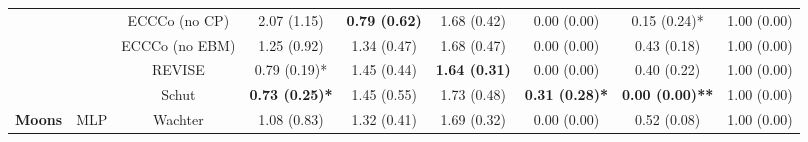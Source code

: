 \begin{table}
{\begin{tabular}[t]{>{}c|c|c|c|c|c|c|c|c}
 &  & ECCCo (no CP) & 2.07 (1.15) & \textbf{0.79 (0.62)} & 1.68 (0.42) & 0.00 (0.00) & 0.15 (0.24)* & 1.00 (0.00)\\

 &  & ECCCo (no EBM) & 1.25 (0.92) & 1.34 (0.47) & 1.68 (0.47) & 0.00 (0.00) & 0.43 (0.18) & 1.00 (0.00)\\

 &  & REVISE & 0.79 (0.19)* & 1.45 (0.44) & \textbf{1.64 (0.31)} & 0.00 (0.00) & 0.40 (0.22) & 1.00 (0.00)\\

 &  & Schut & \textbf{0.73 (0.25)*} & 1.45 (0.55) & 1.73 (0.48) & \textbf{0.31 (0.28)*} & \textbf{0.00 (0.00)**} & 1.00 (0.00)\\

\multirow{-12}{*}{\centering\arraybackslash \textbf{Moons}} & \multirow{-6}{*}{\centering\arraybackslash MLP} & Wachter & 1.08 (0.83) & 1.32 (0.41) & 1.69 (0.32) & 0.00 (0.00) & 0.52 (0.08) & 1.00 (0.00)\\
\hline
\end{tabular}}
\end{table}
